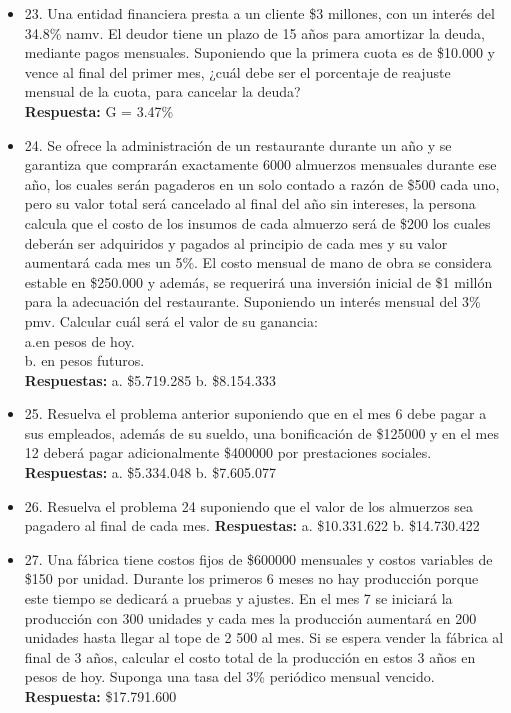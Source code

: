 \begin{itemize}
	\item 23. Una entidad financiera presta a un cliente \$3 millones, con un interés del 34.8\% namv. El deudor tiene un plazo de 15 años para amortizar la deuda, mediante pagos mensuales. Suponiendo que la primera cuota es de \$10.000 y vence al final del primer mes, ¿cuál debe ser el porcentaje de reajuste mensual de la cuota, para cancelar la deuda?\\
	\textbf{Respuesta:} G = 3.47\%
	\medskip
	
	\item 24. Se ofrece la administración de un restaurante durante un año y se garantiza que comprarán exactamente 6000 almuerzos mensuales durante ese año, los cuales serán pagaderos en un solo contado a razón de \$500 cada uno, pero su valor total será cancelado al final del año sin intereses, la persona calcula que el costo de los insumos de cada almuerzo será de \$200 los cuales deberán ser adquiridos y pagados al principio de cada mes y su valor aumentará cada mes un 5\%. El costo mensual de mano de obra se considera estable en \$250.000 y además, se requerirá una inversión inicial de \$1 millón para la adecuación del restaurante. Suponiendo un interés mensual del 3\% pmv. Calcular cuál será el valor de su ganancia:\\
	
	a.en pesos de hoy.\\
	b. en pesos futuros.\\
	\textbf{Respuestas:} a. \$5.719.285 \hspace{1cm}  	b. \$8.154.333\\
	\medskip
	
	\item 25. Resuelva el problema anterior suponiendo que en el mes 6 debe pagar a sus empleados, además de su sueldo, una bonificación de \$125000 y en el mes 12 deberá pagar adicionalmente \$400000 por prestaciones sociales.\\
	\textbf{Respuestas:}  a. \$5.334.048 \hspace{1cm}  	b. \$7.605.077\\
	\medskip
	
	\item 26. Resuelva el problema 24 suponiendo que el valor de los almuerzos sea pagadero al final de cada mes.
	\textbf{Respuestas:} a. \$10.331.622 \hspace{1cm}  	b. \$14.730.422\\
	\medskip
	
	\item 27. Una fábrica tiene costos fijos de \$600000 mensuales y costos variables de \$150 por unidad. Durante los primeros 6 meses no hay producción porque este tiempo se dedicará a pruebas y ajustes. En el mes 7 se iniciará la producción con 300 unidades y cada mes la producción aumentará en 200 unidades hasta llegar al tope de 2 500 al mes. Si se espera vender la fábrica al final de 3 años, calcular el costo total de la producción en estos 3 años en pesos de hoy. Suponga una tasa del 3\% periódico  mensual vencido.\\
	\textbf{Respuesta:}  \$17.791.600\\
	\medskip
	

\end{itemize}
